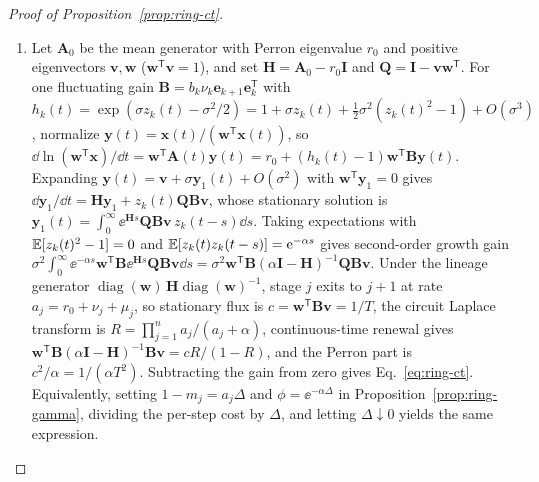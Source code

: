 \begin{proof}[Proof of Proposition~{\upshape\ref{prop:ring-ct}}]
\begin{enumerate}
\item[(a)] Let $\mathbf{A}_0$ be the mean generator with Perron eigenvalue $r_0$ and positive eigenvectors $\mathbf{v}, \mathbf{w}$ ($\mathbf{w}^{\mathsf{T}}\mathbf{v} = 1$), and set $\mathbf{H} = \mathbf{A}_0 - r_0\mathbf{I}$ and $\mathbf{Q} = \mathbf{I} - \mathbf{v}\mathbf{w}^{\mathsf{T}}$. For one fluctuating gain $\mathbf{B} = b_k\nu_k\mathbf{e}_{k+1}\mathbf{e}_k^{\mathsf{T}}$ with $h_k(t) = \exp(\sigma z_k(t) - \sigma^2/2) = 1 + \sigma z_k(t) + \frac{1}{2}\sigma^2(z_k(t)^2 - 1) + O(\sigma^3)$, normalize $\mathbf{y}(t) = \mathbf{x}(t)/(\mathbf{w}^{\mathsf{T}}\mathbf{x}(t))$, so $\dd\ln(\mathbf{w}^{\mathsf{T}}\mathbf{x})/\dd t = \mathbf{w}^{\mathsf{T}}\mathbf{A}(t)\mathbf{y}(t) = r_0 + (h_k(t) - 1)\mathbf{w}^{\mathsf{T}}\mathbf{B}\mathbf{y}(t)$. Expanding $\mathbf{y}(t) = \mathbf{v} + \sigma\mathbf{y}_1(t) + O(\sigma^2)$ with $\mathbf{w}^{\mathsf{T}}\mathbf{y}_1 = 0$ gives $\dd\mathbf{y}_1/\dd t = \mathbf{H}\mathbf{y}_1 + z_k(t)\mathbf{Q}\mathbf{B}\mathbf{v}$, whose stationary solution is $\mathbf{y}_1(t) = \int_0^{\infty} \ee^{\mathbf{H}s}\mathbf{Q}\mathbf{B}\mathbf{v}\,z_k(t - s)\dd s$. Taking expectations with $\mathbb{E}[z_k(t)^2 - 1] = 0$ and $\mathbb{E}[z_k(t)z_k(t - s)] = \mathrm{e}^{-\alpha s}$ gives second-order growth gain $\sigma^2\int_0^{\infty} \ee^{-\alpha s}\mathbf{w}^{\mathsf{T}}\mathbf{B}\ee^{\mathbf{H}s}\mathbf{Q}\mathbf{B}\mathbf{v}\dd s = \sigma^2\mathbf{w}^{\mathsf{T}}\mathbf{B}(\alpha\mathbf{I} - \mathbf{H})^{-1}\mathbf{Q}\mathbf{B}\mathbf{v}$. Under the lineage generator $\operatorname{diag}(\mathbf{w})\,\mathbf{H}\operatorname{diag}(\mathbf{w})^{-1}$, stage $j$ exits to $j + 1$ at rate $a_j = r_0 + \nu_j + \mu_j$, so stationary flux is $c = \mathbf{w}^{\mathsf{T}}\mathbf{B}\mathbf{v} = 1/T$, the circuit Laplace transform is $R = \prod_{j=1}^n a_j/(a_j + \alpha)$, continuous-time renewal gives $\mathbf{w}^{\mathsf{T}}\mathbf{B}(\alpha\mathbf{I} - \mathbf{H})^{-1}\mathbf{B}\mathbf{v} = c R/(1 - R)$, and the Perron part is $c^2/\alpha = 1/(\alpha T^2)$. Subtracting the gain from zero gives Eq.~\eqref{eq:ring-ct}. Equivalently, setting $1 - m_j = a_j\Delta$ and $\phi = \ee^{-\alpha\Delta}$ in Proposition~\ref{prop:ring-gamma}, dividing the per-step cost by $\Delta$, and letting $\Delta \downarrow 0$ yields the same expression.


\end{enumerate}
\end{proof}
